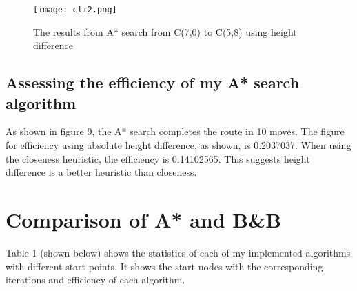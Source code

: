 \documentclass[11pt,oneside]{article}
\begin{document}
\begin{figure}[ht]
\centering
  \texttt{[image: cli2.png]}
  \caption{The results from A* search from C(7,0) to C(5,8) using height difference}
  \label{fig:cli2}
\end{figure}

\subsection{Assessing the efficiency of my A* search algorithm}

As shown in figure 9, the A* search completes the route in 10 moves. The figure for efficiency using absolute height difference, as shown, is 0.2037037. When using the closeness heuristic, the efficiency is 0.14102565. This suggests height difference is a better heuristic than closeness.

\pagebreak

\section{Comparison of A* and B&B }

Table 1 (shown below) shows the statistics of each of my implemented algorithms with different start points. It shows the start nodes with the corresponding iterations and efficiency of each algorithm.
\end{document}
